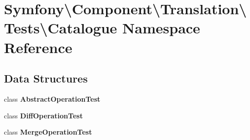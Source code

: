 \section{Symfony\textbackslash{}Component\textbackslash{}Translation\textbackslash{}Tests\textbackslash{}Catalogue Namespace Reference}
\label{namespace_symfony_1_1_component_1_1_translation_1_1_tests_1_1_catalogue}
\subsection*{Data Structures}
\begin{DoxyCompactItemize}
\item 
class {\bf Abstract\+Operation\+Test}
\item 
class {\bf Diff\+Operation\+Test}
\item 
class {\bf Merge\+Operation\+Test}
\end{DoxyCompactItemize}
